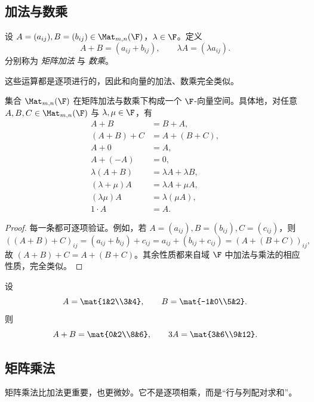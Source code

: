 \subsection{加法与数乘}

\begin{definition}
设 $A=(a_{ij}),B=(b_{ij})\in\Mat_{m,n}(\F)$，$\lambda\in\F$。定义
\[
A+B=(a_{ij}+b_{ij}),\qquad \lambda A=(\lambda a_{ij}).
\]
分别称为 \emph{矩阵加法} 与 \emph{数乘}。
\end{definition}

这些运算都是逐项进行的，因此和向量的加法、数乘完全类似。

\begin{proposition}
集合 $\Mat_{m,n}(\F)$ 在矩阵加法与数乘下构成一个 $\F$-向量空间。具体地，对任意 $A,B,C\in\Mat_{m,n}(\F)$ 与 $\lambda,\mu\in\F$，有
\begin{align*}
A+B&=B+A,\\
(A+B)+C&=A+(B+C),\\
A+0&=A,\\
A+(-A)&=0,\\
\lambda(A+B)&=\lambda A+\lambda B,\\
(\lambda+\mu)A&=\lambda A+\mu A,\\
(\lambda\mu)A&=\lambda(\mu A),\\
1\cdot A&=A.
\end{align*}
\end{proposition}

\begin{proof}
每一条都可逐项验证。例如，若 $A=(a_{ij}),B=(b_{ij}),C=(c_{ij})$，则
\[
((A+B)+C)_{ij}=(a_{ij}+b_{ij})+c_{ij}=a_{ij}+(b_{ij}+c_{ij})=(A+(B+C))_{ij},
\]
故 $(A+B)+C=A+(B+C)$。其余性质都来自域 $\F$ 中加法与乘法的相应性质，完全类似。
\end{proof}

\begin{example}
设
\[
A=\mat{1&2\\3&4},\qquad B=\mat{-1&0\\5&2}.
\]
则
\[
A+B=\mat{0&2\\8&6},
\qquad 3A=\mat{3&6\\9&12}.
\]
\end{example}

\subsection{矩阵乘法}

矩阵乘法比加法更重要，也更微妙。它不是逐项相乘，而是“行与列配对求和”。

